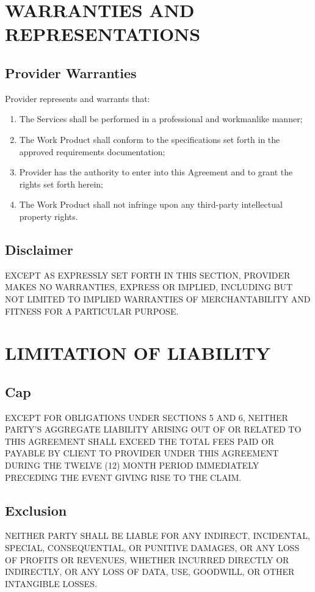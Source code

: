 \documentclass[
    language=english,
    doctype=contract,
    institution=none,
]{../../omnilatex}
\begin{document}
\section{WARRANTIES AND REPRESENTATIONS}

\subsection{Provider Warranties}
Provider represents and warrants that:
\begin{enumerate}
    \item The Services shall be performed in a professional and workmanlike manner;
    \item The Work Product shall conform to the specifications set forth in the approved requirements documentation;
    \item Provider has the authority to enter into this Agreement and to grant the rights set forth herein;
    \item The Work Product shall not infringe upon any third-party intellectual property rights.
\end{enumerate}

\subsection{Disclaimer}
EXCEPT AS EXPRESSLY SET FORTH IN THIS SECTION, PROVIDER MAKES NO WARRANTIES, EXPRESS OR IMPLIED, INCLUDING BUT NOT LIMITED TO IMPLIED WARRANTIES OF MERCHANTABILITY AND FITNESS FOR A PARTICULAR PURPOSE.

\section{LIMITATION OF LIABILITY}

\subsection{Cap}
EXCEPT FOR OBLIGATIONS UNDER SECTIONS 5 AND 6, NEITHER PARTY'S AGGREGATE LIABILITY ARISING OUT OF OR RELATED TO THIS AGREEMENT SHALL EXCEED THE TOTAL FEES PAID OR PAYABLE BY CLIENT TO PROVIDER UNDER THIS AGREEMENT DURING THE TWELVE (12) MONTH PERIOD IMMEDIATELY PRECEDING THE EVENT GIVING RISE TO THE CLAIM.

\subsection{Exclusion}
NEITHER PARTY SHALL BE LIABLE FOR ANY INDIRECT, INCIDENTAL, SPECIAL, CONSEQUENTIAL, OR PUNITIVE DAMAGES, OR ANY LOSS OF PROFITS OR REVENUES, WHETHER INCURRED DIRECTLY OR INDIRECTLY, OR ANY LOSS OF DATA, USE, GOODWILL, OR OTHER INTANGIBLE LOSSES.
\end{document}
